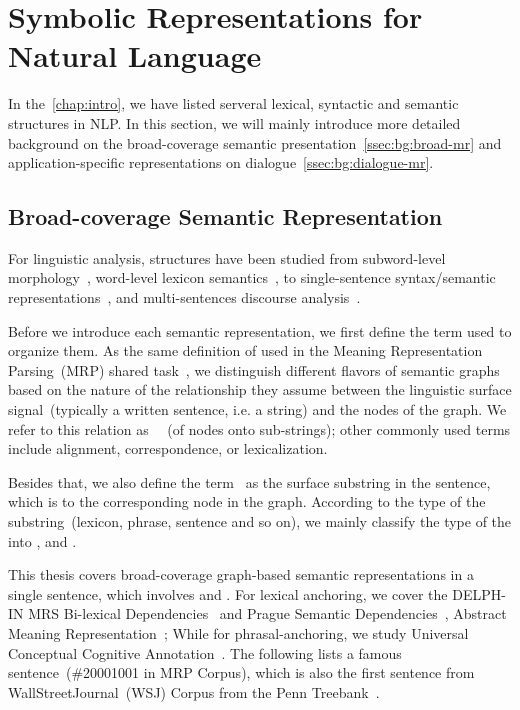 \section{Symbolic Representations for Natural Language}
\label{sec:bg:symbolic}
In the~\autoref{chap:intro}, we have listed serveral lexical,
syntactic and semantic structures in NLP. In this section, we will
mainly introduce more detailed background on the broad-coverage
semantic presentation~\autoref{ssec:bg:broad-mr} and
application-specific representations on
dialogue~\autoref{ssec:bg:dialogue-mr}.

\subsection{Broad-coverage Semantic Representation}
\label{ssec:bg:broad-mr}

For linguistic analysis, structures have been studied from
subword-level morphology~\cite{beesley2003finite}, word-level lexicon
semantics~\cite{miller1998wordnet}, to single-sentence syntax/semantic
representations~\cite{baker1998berkeley,palmer2005proposition,collins2003head},
and multi-sentences discourse
analysis~\cite{carlson2003building,wolf2005representing,prasad2008penn}.

 Before we introduce each semantic
representation, we first define the term  used to
organize them. As the same definition of  used in the
Meaning Representation Parsing~(MRP) shared
task~\citep{Oep:Abe:Haj:19}, we distinguish different flavors of
semantic graphs based on the nature of the relationship they assume
between the linguistic surface signal~(typically a written sentence,
i.e. a string) and the nodes of the graph. We refer to this relation
as ~~(of nodes onto sub-strings); other commonly used
terms include alignment, correspondence, or lexicalization.

 Besides that, we also define the term~ as
the surface substring in the sentence, which is  to the
corresponding node in the graph. According to the type of the
substring~(lexicon, phrase, sentence and so on), we mainly classify
the type of the  into ,
 and
.

This thesis covers broad-coverage graph-based semantic representations
in a single sentence, which involves  and
. For lexical anchoring, we cover the DELPH-IN
MRS Bi-lexical Dependencies~\cite[DM,][]{ivanova2012did} and Prague
Semantic
Dependencies~\cite[PSD,][]{hajic2012announcing,miyao2014house},
Abstract Meaning Representation~\cite[AMR,][]{Ban:Bon:Cai:13}; While
for phrasal-anchoring, we study Universal Conceptual Cognitive
Annotation~\cite[UCCA,][]{Abe:Rap:13b}. The following lists a famous
sentence~(\#20001001 in MRP Corpus), which is also the first sentence
from WallStreetJournal~(WSJ) Corpus from the Penn
Treebank~\citep{Mar:San:Mar:93}.

